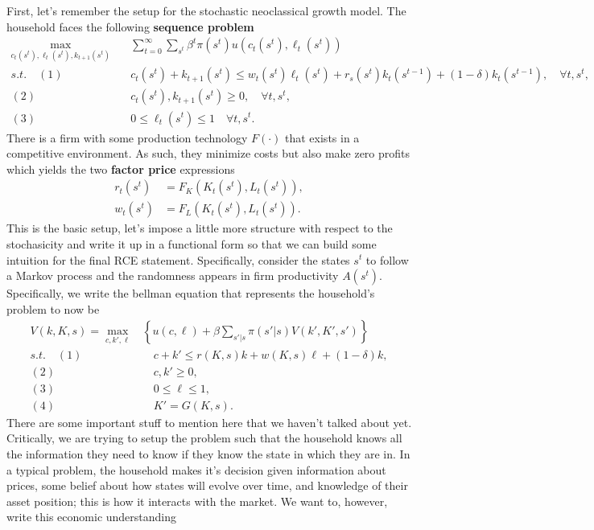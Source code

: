 \documentclass[11pt,english]{article}
\begin{document}
First, let's remember the setup for the stochastic neoclassical growth model. The household faces the following \textbf{sequence problem} 
\begin{align*}
\max_{c_t(s^t), \ell_t(s^t), k_{t+1}(s^t)}& \quad \sum_{t=0}^\infty \sum_{s^t} \beta^t \pi(s^t) u(c_t(s^t), \ell_t(s^t))\\
s.t.\quad (1)&\quad c_t(s^t) + k_{t+1}(s^t) \leq w_t(s^t)\ell_t(s^t) + r_s(s^t)k_t(s^{t-1}) + (1 - \delta)k_t(s^{t-1}),\quad \forall t, s^t,\\
(2)&\quad c_t(s^t), k_{t+1}(s^t) \geq 0, \quad \forall t, s^t,\\
(3)&\quad 0 \leq \ell_t(s^t) \leq 1 \quad \forall t, s^t.
\end{align*}There is a firm with some production technology $F(\cdot)$ that exists in a competitive environment. As such, they minimize costs but also make zero profits which yields the two \textbf{factor price} expressions
\begin{align*}
r_t(s^t) &= F_K(K_t(s^t), L_t(s^t)),\\
w_t(s^t) &= F_L(K_t(s^t), L_t(s^t)).
\end{align*} This is the basic setup, let's impose a little more structure with respect to the stochasicity and write it up in a functional form so that we can build some intuition for the final RCE statement. Specifically, consider the states $s^t$ to follow a Markov process and the randomness appears in firm productivity $A(s^t)$. Specifically, we write the bellman equation that represents the household's problem to now be 
\begin{align*}
V(k, K, s) = \max_{c, k', \ell}&\left\{u(c, \ell) + \beta \sum_{s'|s}\pi(s'|s) V(k',K',s')\right\}\\
s.t.\quad (1)&\quad c + k' \leq r(K,s)k + w(K,s)\ell+ (1 - \delta)k,\\
(2)&\quad c, k'\geq 0,\\
(3)&\quad 0 \leq \ell \leq 1,\\
(4)&\quad K' = G(K,s).
\end{align*}There are some important stuff to mention here that we haven't talked about yet. Critically, we are trying to setup the problem such that the household knows all the information they need to know if they know the state in which they are in. In a typical problem, the household makes it's decision given information about prices, some belief about how states will evolve over time, and knowledge of their asset position; this is how it interacts with the market. We want to, however, write this economic understanding 
\end{document}
